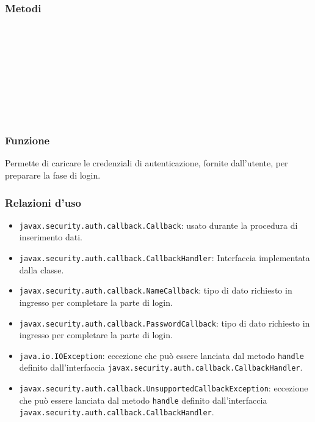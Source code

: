 \subsubsection*{Metodi}
\begin{description}
	\item{}\\

	\item{}\\
	
	\item{}\\
	
	\item{}\\
	
	\item{}\\

\end{description}


\subsubsection*{Funzione}
Permette di caricare le credenziali di autenticazione, fornite dall'utente, per preparare la fase di login.

\subsubsection*{Relazioni d'uso}
\begin{itemize}
	\item \texttt{javax.security.auth.callback.Callback}: usato durante la procedura di inserimento dati.
	\item \texttt{javax.security.auth.callback.CallbackHandler}: Interfaccia implementata dalla classe.
	\item \texttt{javax.security.auth.callback.NameCallback}: tipo di dato richiesto in ingresso per completare la parte di login.
	\item \texttt{javax.security.auth.callback.PasswordCallback}: tipo di dato richiesto in ingresso per completare la parte di login.
	\item \texttt{java.io.IOException}: eccezione che può essere lanciata dal metodo \texttt{handle} definito dall'interfaccia \texttt{javax.security.auth.callback.CallbackHandler}.
	\item \texttt{javax.security.auth.callback.UnsupportedCallbackException}: eccezione che può essere lanciata dal metodo \texttt{handle} definito dall'interfaccia \texttt{javax.security.auth.callback.CallbackHandler}.
\end{itemize}

